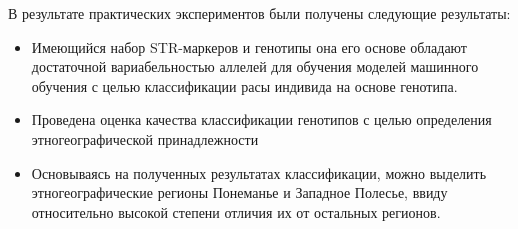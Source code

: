 В результате практических экспериментов были получены следующие результаты:
\begin{itemize}
\item Имеющийся набор STR-маркеров и генотипы она его основе обладают достаточной вариабельностью аллелей
для обучения моделей машинного обучения с целью классификации расы индивида на основе генотипа.

\item Проведена оценка качества классификации генотипов с целью определения этногеографической принадлежности

\item Основываясь на полученных результатах классификации, можно выделить этногеографические регионы
Понеманье и Западное Полесье, ввиду относительно высокой степени отличия их от остальных регионов.
\end{itemize}
